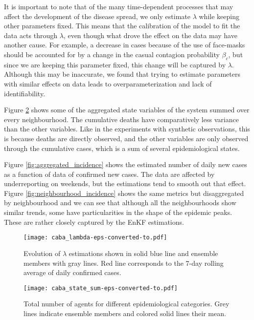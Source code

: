 \documentclass[11pt,a4paper]{article}
\begin{document}
It is important to note that of the many time-dependent processes that may affect the development of the disease spread, we only estimate $\lambda$ while keeping other parameters fixed. This means that the calibration of the model to fit the data acts through $\lambda$, even though what drove the effect on the data may have another cause. For example, a decrease in cases because of the use of face-masks should be accounted for by a change in the casual contagion probability $\beta_c$, but since we are keeping this parameter fixed, this change will be captured by $\lambda$. Although this may be inaccurate, we found that trying to estimate parameters with similar effects on data leads to overparameterization and lack of identifiability. 

Figure \ref{fig:caba_state_sum} shows some of the aggregated state variables of the system summed over every neighbourhood. The cumulative deaths have comparatively less variance than the other variables. Like in the experiments with synthetic observations, this is because deaths are directly observed, and the other variables are only observed through the cumulative cases, which is a sum of several epidemiological states.

Figure \ref{fig:aggregated_incidence} shows the estimated number of daily new cases as a function of data of confirmed new cases. The data are affected by underreporting on weekends, but the estimations tend to smooth out that effect. Figure \ref{fig:neighbourhood_incidence} shows the same metrics but disaggregated by neighbourhood and we can see that although all the neighbourhoods show similar trends, some have particularities in the shape of the epidemic peaks. These are rather closely captured by the EnKF estimations.

\begin{figure}
    \captionsetup{width=0.5\textwidth}
    \centering
    \texttt{[image: caba\_lambda-eps-converted-to.pdf]}
    \caption{Evolution of $\lambda$ estimations shown in solid blue line and ensemble members with gray lines. Red line corresponds to the 7-day rolling average of daily confirmed cases.}
    \label{fig:caba_r0}
\end{figure}

\begin{figure}
    \captionsetup{width=0.5\textwidth}
    \centering
    \texttt{[image: caba\_state\_sum-eps-converted-to.pdf]}
    \caption{Total number of agents for different epidemiological categories. Grey lines indicate ensemble members and colored solid lines their mean.}
    \label{fig:caba_state_sum}
\end{figure}
\end{document}
